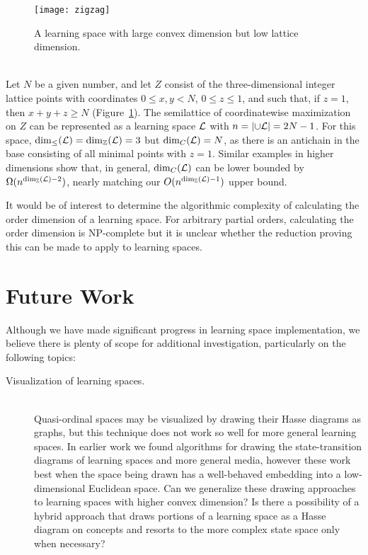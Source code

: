 \documentclass[11pt]{llncs}
\def\Zee{\ensuremath{\Bbb Z}}
\begin{document}
{\begin{description}
\begin{figure}[t]
\centering\texttt{[image: zigzag]}
\caption{A learning space with large convex dimension but low lattice dimension.}
\label{fig:zigzag}
\end{figure}

\item[A three-dimensional zigzag.] \hfill\\
Let $N$ be a given number, and let $Z$ consist of the three-dimensional integer lattice points with coordinates $0\le x,y<N$, $0\le z\le 1$, and such that, if $z=1$, then $x+y+z\ge N$ (Figure~\ref{fig:zigzag}).
The semilattice of coordinatewise maximization on $Z$ can be represented as a learning space $\cal L$ with $n=|{\cup\cal L}|=2N-1$. For this space,
${\rm dim}_\le({\cal L})={\rm dim}_\Zee({\cal L})=3$
but ${\rm dim}_C({\cal L})=N$, as there is an antichain in the base consisting of all minimal points with $z=1$. Similar examples in higher dimensions show that, in general, ${\rm dim}_C({\cal L})$ can be lower bounded by $\Omega(n^{{\rm dim}_\Zee({\cal L})-2})$,
nearly matching our $O(n^{{\rm dim}_\Zee({\cal L})-1})$ upper bound.
\end{description}

It would be of interest to determine the algorithmic complexity of calculating the order dimension of a learning space. For arbitrary partial orders, calculating the order dimension is NP-complete \citep{Yan-SIADM-82} but it is unclear whether the reduction proving this can be made to apply to learning spaces.

\section{Future Work}

Although we have made significant progress in learning space implementation, we believe there is plenty of scope for additional investigation, particularly on the following topics:

\begin{description}
\item[Visualization of learning spaces.] \hfill\\
Quasi-ordinal spaces may be visualized by drawing their Hasse diagrams as graphs, but this technique does not work so well for more general learning spaces.
In earlier work \citep{eppst04,eppst06} we found algorithms for drawing the state-transition diagrams of learning spaces and more general media, however these work best when the space being drawn has a well-behaved embedding into a low-dimensional Euclidean space. Can we generalize these drawing approaches to learning spaces with higher convex dimension? Is there a possibility of a hybrid approach that  draws portions of a learning space as a Hasse diagram on concepts and resorts to the more complex state space only when necessary?


\end{description}}
\end{document}
